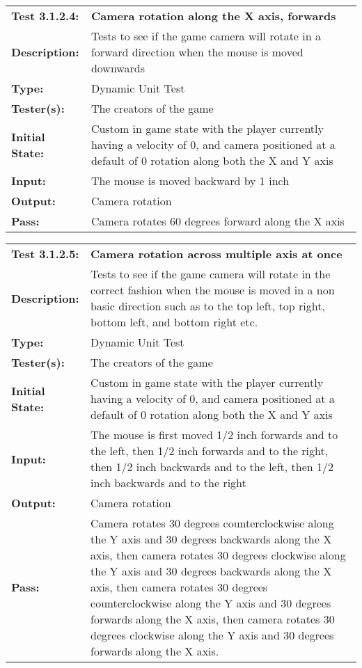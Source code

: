 \documentclass[12pt, titlepage]{article}
\begin{document}
\begin{mdframed}[linewidth=1pt]
\begin{tabularx}{\textwidth}{@{}p{3cm}X@{}}
{\bf Test 3.1.2.4:} & {\bf Camera rotation along the X axis, forwards}\\[\baselineskip]
{\bf Description:} & Tests to see if the game camera will rotate in a forward direction when the mouse is moved downwards\\[0.5\baselineskip]
{\bf Type:} & Dynamic Unit Test\\[0.5\baselineskip]
{\bf Tester(s):} & The creators of the game\\[0.5\baselineskip]
{\bf Initial State:} & Custom in game state with the player currently having a velocity of 0, and camera positioned at a default of 0 rotation along both the X and Y axis\\[0.5\baselineskip]
{\bf Input:} & The mouse is moved backward by 1 inch\\[0.5\baselineskip]
{\bf Output:} & Camera rotation\\[0.5\baselineskip]
{\bf Pass:} & Camera rotates 60 degrees forward along the X axis
\end{tabularx}
\end{mdframed}

\begin{mdframed}[linewidth=1pt]
\begin{tabularx}{\textwidth}{@{}p{3cm}X@{}}
{\bf Test 3.1.2.5:} & {\bf Camera rotation across multiple axis at once}\\[\baselineskip]
{\bf Description:} & Tests to see if the game camera will rotate in the correct fashion when the mouse is moved in a non basic direction such as to the top left,  top right, bottom left, and bottom right etc. \\[0.5\baselineskip]
{\bf Type:} & Dynamic Unit Test\\[0.5\baselineskip]
{\bf Tester(s):} & The creators of the game\\[0.5\baselineskip]
{\bf Initial State:} & Custom in game state with the player currently having a velocity of 0, and camera positioned at a default of 0 rotation along both the X and Y axis\\[0.5\baselineskip]
{\bf Input:} & The mouse is first moved 1/2 inch forwards and to the left, then 1/2 inch forwards and to the right, then 1/2 inch backwards and to the left, then 1/2 inch backwards and to the right\\[0.5\baselineskip]
{\bf Output:} & Camera rotation\\[0.5\baselineskip]
{\bf Pass:} & Camera rotates 30 degrees counterclockwise along the Y axis and 30 degrees backwards along the X axis, then camera rotates 30 degrees clockwise along the Y axis and 30 degrees backwards along the X axis, then camera rotates 30 degrees counterclockwise along the Y axis and 30 degrees forwards along the X axis, then camera rotates 30 degrees clockwise along the Y axis and 30 degrees forwards along the X axis.
\end{tabularx}
\end{mdframed}
\end{document}
